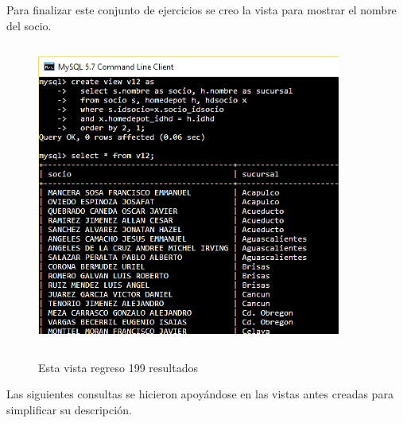 \documentclass[12pt, titlepage]{article}
\begin{document}
	Para finalizar este conjunto de ejercicios se creo la vista para mostrar el nombre del socio.
	\begin{figure}[H]
		\begin{center}
			\includegraphics[width=10cm, height=10cm]{img/v12.png}
			\label{fig:12}
			\caption{Esta vista regreso 199 resultados}
		\end{center}
	\end{figure}
	
	Las siguientes consultas se hicieron apoyándose en las vistas antes creadas para simplificar su descripción.
	
\end{document}
